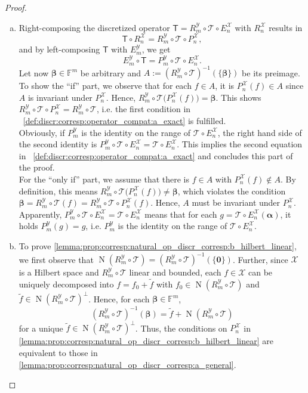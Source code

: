 \documentclass[a4paper]{paper}
\newcommand{\Spc}[1]{\mathscr{#1}}
\newcommand{\Field}{\mathbb{F}}
\newcommand{\Op}[1]{\mathcal{#1}}
\newcommand{\DiscOp}[1]{\mathsf{#1}}
\newcommand*{\EXT}[2]{\ensuremath{E_{#1}^{#2}}}
\newcommand*{\REST}[2]{\ensuremath{R_{#1}^{#2}}}
\newcommand*{\PROJ}[2]{\ensuremath{P_{#1}^{#2}}}
\newcommand*{\RnX}{\ensuremath{\REST{n}{\Spc{X}}}}
\newcommand*{\RmY}{\ensuremath{\REST{m}{\Spc{Y}}}}
\newcommand*{\EnX}{\ensuremath{\EXT{n}{\Spc{X}}}}
\newcommand*{\EmY}{\ensuremath{\EXT{m}{\Spc{Y}}}}
\newcommand*{\PnX}{\ensuremath{\PROJ{n}{\Spc{X}}}}
\newcommand*{\PmY}{\ensuremath{\PROJ{m}{\Spc{Y}}}}
\DeclareMathOperator{\nullspace}{N}
\newcommand{\vzero}{\boldsymbol{0}}
\newcommand{\valpha}{\boldsymbol{\alpha}}
\newcommand{\vbeta}{\boldsymbol{\beta}}
\begin{document}
\begin{proof}~
 \begin{enumerate}[(a)]
  \item Right-composing the discretized operator $\DiscOp{T} = \RmY \circ \Op{T} \circ \EnX$ with $\RnX$ results in
  \begin{equation*}
   \DiscOp{T} \circ \RnX = \RmY \circ \Op{T} \circ \PnX,
  \end{equation*}
  and by left-composing $\DiscOp{T}$ with $\EmY$, we get
  \begin{equation*}
   \EmY \circ \DiscOp{T} = \PmY \circ \Op{T} \circ \EnX.
  \end{equation*}
  Let now $\vbeta \in \Field^m$ be arbitrary and $A := (\RmY \circ \Op{T})^{-1}(\{\vbeta\})$ be its preimage.
  To show the ``if'' part, we observe that for each $f \in A$, it is $\PnX(f) \in A$ since $A$ is invariant under 
  $\PnX$. Hence, $\RmY \circ \Op{T} \big( \PnX(f) \big) = \vbeta$. This shows 
  $\RmY \circ \Op{T} \circ \PnX = \RmY \circ \Op{T}$, i.e. the first condition 
  in ~\eqref{def:discr:corresp:operator_compat:a_exact} is fulfilled.\\
  Obviously, if $\PmY$ is the identity on the range of $\Op{T} \circ \EnX$, the right hand side of the second identity 
  is $\PmY \circ \Op{T} \circ \EnX = \Op{T} \circ \EnX$. This implies the second equation in 
  ~\eqref{def:discr:corresp:operator_compat:a_exact} and concludes this part of 
  the proof.\\
  For the ``only if'' part, we assume that there is $f \in A$ with $\PnX(f) \not\in A$. By definition, this means 
  $\RmY \circ \Op{T} \big( \PnX(f) \big) \neq \vbeta$, which violates the condition
  $\vbeta = \RmY \circ \Op{T} (f) = \RmY \circ \Op{T} \circ \PnX (f)$. Hence, $A$ must be invariant under $\PnX$.\\
  Apparently, $\PmY \circ \Op{T} \circ \EnX = \Op{T} \circ \EnX$ means that for each $g = \Op{T} \circ \EnX(\valpha)$, 
  it holds $\PmY(g) = g$, i.e. $\PmY$ is the identity on the range of $\Op{T} \circ \EnX$.

  \item To prove \eqref{lemma:prop:corresp:natural_op_discr_corresp:b_hilbert_linear}, we first observe that 
  $\nullspace(\RmY \circ \Op{T}) = (\RmY \circ \Op{T})^{-1}(\{\vzero\})$. Further, since $\Spc{X}$ is a Hilbert space 
  and $\RmY \circ \Op{T}$ linear and bounded, each $f \in \Spc{X}$ can be uniquely decomposed into 
  $f = f_0 + \tilde f$ with  $f_0 \in \nullspace(\RmY \circ \Op{T})$ and 
  $\tilde f \in \nullspace(\RmY \circ \Op{T})^\perp$. Hence, for each $\vbeta \in \Field^m$,
  \begin{equation*}
   (\RmY \circ \Op{T})^{-1}({\vbeta}) = \tilde f + \nullspace(\RmY \circ \Op{T})
  \end{equation*}
  for a unique $\tilde f \in \nullspace(\RmY \circ \Op{T})^\perp$. Thus, the conditions on $\PnX$ in 
  \eqref{lemma:prop:corresp:natural_op_discr_corresp:b_hilbert_linear} are equivalent to those in   
  \eqref{lemma:prop:corresp:natural_op_discr_corresp:a_general}.
  

\end{enumerate}
\end{proof}
\end{document}
